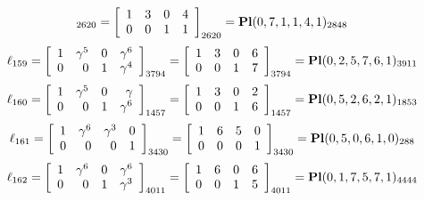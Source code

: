 \documentclass{article}
\begin{document}
{$$_{2620}
=
\left[
\begin{array}{*{4}c}
1  & 3  & 0  & 4\\
0  & 0  & 1  & 1\\
\end{array}
\right]_{2620}
={\rm\bf Pl}(0,7,1,1,4,1 )_{2848}$$
$$
\ell_{159} = 
\left[
\begin{array}{*{4}{r}}
1 & \gamma^{5} & 0 & \gamma^{6}\\
0 & 0 & 1 & \gamma^{4}\\
\end{array}
\right]
_{3794}
=
\left[
\begin{array}{*{4}c}
1  & 3  & 0  & 6\\
0  & 0  & 1  & 7\\
\end{array}
\right]_{3794}
={\rm\bf Pl}(0,2,5,7,6,1 )_{3911}$$
$$
\ell_{160} = 
\left[
\begin{array}{*{4}{r}}
1 & \gamma^{5} & 0 & \gamma \\
0 & 0 & 1 & \gamma^{6}\\
\end{array}
\right]
_{1457}
=
\left[
\begin{array}{*{4}c}
1  & 3  & 0  & 2\\
0  & 0  & 1  & 6\\
\end{array}
\right]_{1457}
={\rm\bf Pl}(0,5,2,6,2,1 )_{1853}$$
$$
\ell_{161} = 
\left[
\begin{array}{*{4}{r}}
1 & \gamma^{6} & \gamma^{3} & 0\\
0 & 0 & 0 & 1\\
\end{array}
\right]
_{3430}
=
\left[
\begin{array}{*{4}c}
1  & 6  & 5  & 0\\
0  & 0  & 0  & 1\\
\end{array}
\right]_{3430}
={\rm\bf Pl}(0,5,0,6,1,0 )_{288}$$
$$
\ell_{162} = 
\left[
\begin{array}{*{4}{r}}
1 & \gamma^{6} & 0 & \gamma^{6}\\
0 & 0 & 1 & \gamma^{3}\\
\end{array}
\right]
_{4011}
=
\left[
\begin{array}{*{4}c}
1  & 6  & 0  & 6\\
0  & 0  & 1  & 5\\
\end{array}
\right]_{4011}
={\rm\bf Pl}(0,1,7,5,7,1 )_{4444}$$
}
\end{document}
